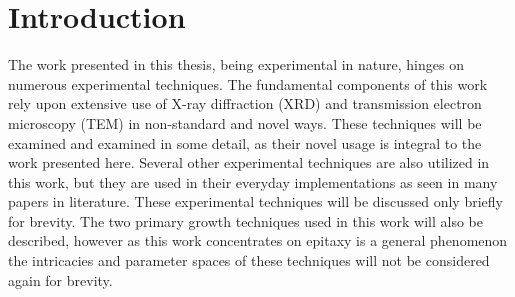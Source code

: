 \section{Introduction}
The work presented in this thesis, being experimental in nature, hinges on numerous experimental techniques. The fundamental components of this work rely upon extensive use of X-ray diffraction (XRD) and transmission electron microscopy (TEM) in non-standard and novel ways. These techniques will be examined and examined in some detail, as their novel usage is integral to the work presented here. Several other experimental techniques are also utilized in this work, but they are used in their everyday implementations as seen in many papers in literature. These experimental techniques will be discussed only briefly for brevity. The two primary growth techniques used in this work will also be described, however as this work concentrates on epitaxy is a general phenomenon the intricacies and parameter spaces of these techniques will not be considered again for brevity.

